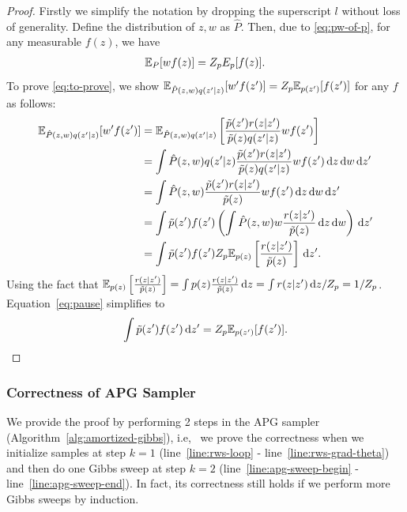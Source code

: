 \documentclass[anonymous=false, %
               format=acmsmall, %
               review=true, %
               screen=true, %
               nonacm=true]{acmart}
\theoremstyle{definition}
\newcommand{\given}{\lvert}
\begin{document}
\begin{proof}
    Firstly we simplify the notation by dropping the superscript $l$ without loss of generality. Define the distribution of $z, w$ as $\hat{P}$.
    Then, due to \eqref{eq:pw-of-p}, for any measurable $f(z)$, we have
    \begin{align*}
        \mathbb{E}_P[w f(z)] = Z_p E_{p}[f(z)].
    \end{align*}
    To prove \eqref{eq:to-prove}, we show $\E_{\hat{P}(z, w)q(z' \given z)}[w' f(z')] = Z_p \E_{p(z')}[f(z')]$ for any $f$ as follows:
    \begin{align}
        \E_{\hat{P}(z, w)q(z' \given z)}[w' f(z')]
        &= \E_{\hat{P}(z, w)q(z' \given z)}\left[\frac{\tilde p(z')r(z \given z')}{\tilde p(z)q(z' \given z)} w f(z')\right] 
        \nonumber\\
        &= \int \hat{P}(z, w)q(z' \given z) \frac{\tilde p(z')r(z \given z')}{\tilde p(z)q(z' \given z)} w f(z') \,\mathrm dz \,\mathrm dw \,\mathrm dz' 
        \nonumber\\
        &= \int \hat{P}(z, w) \frac{\tilde p(z')r(z \given z')}{\tilde p(z)} w f(z') \,\mathrm dz \,\mathrm dw \,\mathrm dz' 
        \nonumber\\
        &= \int \tilde p(z') f(z') \left(\int \hat{P}(z, w) w \frac{r(z \given z')}{\tilde p(z)}\,\mathrm dz \,\mathrm dw\right) \,\mathrm dz'
        \nonumber\\
        &= \int \tilde p(z') f(z') Z_p \E_{p(z)}\left[\frac{r(z \given z')}{\tilde p(z)}\right] \,\mathrm dz'. \label{eq:pause}
    \end{align}
    Using the fact that $\E_{p(z)}\left[\frac{r(z \given z')}{\tilde p(z)}\right] = \int p(z) \frac{r(z \given z')}{\tilde p(z)} \,\mathrm dz = \int r(z \given z') \,\mathrm dz / Z_p = 1 / Z_p$.
    Equation~\ref{eq:pause} simplifies to
    \begin{align*}
        \int \tilde p(z') f(z') \,\mathrm dz' = Z_p \mathbb{E}_{p(z')}[f(z')].
    \end{align*}
\end{proof}

\subsubsection{Correctness of APG Sampler}
We provide the proof by performing 2 steps in the APG sampler (Algorithm~\ref{alg:amortized-gibbs}), i.e,~ we prove the correctness when we initialize samples at step $k=1$ (line~\ref{line:rws-loop} - line~\ref{line:rws-grad-theta}) and then do one Gibbs sweep at step $k=2$ (line~\ref{line:apg-sweep-begin} - line~\ref{line:apg-sweep-end}). In fact, its correctness still holds if we perform more Gibbs sweeps by induction.
\end{document}
